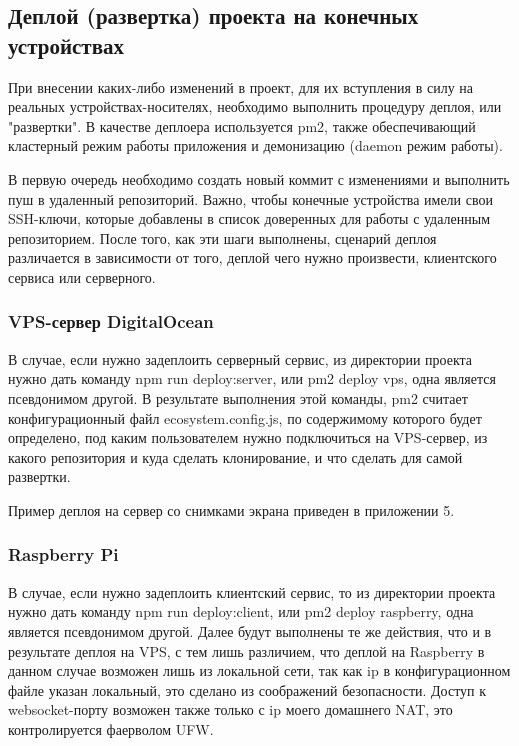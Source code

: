 \documentclass[a4paper, 12pt]{article}
\begin{document}
    \subsection*{Деплой (развертка) проекта на конечных устройствах}
    При внесении каких-либо изменений в проект, для их вступления в силу на реальных устройствах-носителях, необходимо
    выполнить процедуру деплоя, или "развертки". В качестве деплоера используется pm2, также обеспечивающий кластерный режим
    работы приложения и демонизацию (daemon режим работы).

    В первую очередь необходимо создать новый коммит с изменениями и выполнить пуш в удаленный репозиторий. Важно, чтобы
    конечные устройства имели свои SSH-ключи, которые добавлены в список доверенных для работы с удаленным репозиторием.
    После того, как эти шаги выполнены, сценарий деплоя различается в зависимости от того, деплой чего нужно произвести,
    клиентского сервиса или серверного.

    \subsubsection*{VPS-сервер DigitalOcean}
    В случае, если нужно задеплоить серверный сервис, из директории проекта нужно дать команду npm run deploy:server, или
    pm2 deploy vps, одна является псевдонимом другой.
    В результате выполнения этой команды, pm2 считает конфигурационный файл ecosystem.config.js, по содержимому которого
    будет определено, под каким пользователем нужно подключиться на VPS-сервер, из какого репозитория и куда сделать
    клонирование, и что сделать для самой развертки.

    Пример деплоя на сервер со снимками экрана приведен в приложении 5.

    \subsubsection*{Raspberry Pi}
    В случае, если нужно задеплоить клиентский сервис, то из директории проекта нужно дать команду npm run deploy:client, или
    pm2 deploy raspberry, одна является псевдонимом другой. Далее будут выполнены те же действия, что и в результате
    деплоя на VPS, с тем лишь различием, что деплой на Raspberry в данном случае возможен лишь из локальной сети, так
    как ip в конфигурационном файле указан локальный, это сделано из соображений безопасности. Доступ к websocket-порту
    возможен также только с ip моего домашнего NAT, это контролируется фаерволом UFW.
\end{document}
